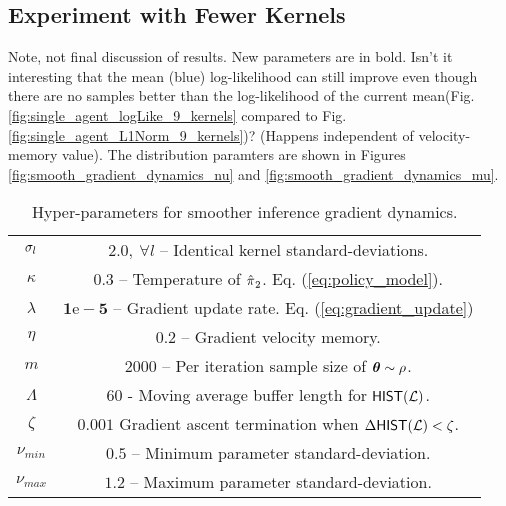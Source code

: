 \subsection{Experiment with Fewer Kernels}

\color{blue} Note, not final discussion of results. \color{black}
New parameters are in bold. Isn't it interesting that the mean (blue) log-likelihood can still improve even though there
are no samples better than the log-likelihood of the current mean(Fig. \ref{fig:single_agent_logLike_9_kernels} compared to Fig. \ref{fig:single_agent_L1Norm_9_kernels})? (Happens independent of velocity-memory value). The distribution paramters are shown in Figures \ref{fig:smooth_gradient_dynamics_nu} and \ref{fig:smooth_gradient_dynamics_mu}.

    \begin{table}[H]
    \centering
    \begin{tabular}{c|c}
        $\sigma_{l}$ & $2.0,\ \forall l$ -- Identical kernel standard-deviations.\\
        $\kappa$ & $\mathbf{0.3}$ -- Temperature of $\hat{\pi_{}}_2$. Eq. (\ref{eq:policy_model}). \\
        $\lambda$ & $\mathbf{1\mathrm{e}\!-\!5}$ -- Gradient update rate. Eq. (\ref{eq:gradient_update}) \\
        $\eta$ & $\mathbf{0.2}$ -- Gradient velocity memory.\\
        $m$ & 2000 -- Per iteration sample size of $\boldsymbol{\mathbb{\theta}}\sim \rho$.\\
        $\Lambda$ & $60$ - Moving average buffer length for $\mathsf{HIST}(\mathcal{L})$. \\
        $\zeta$ & $0.001$ Gradient ascent termination when $\Delta\mathsf{HIST}(\mathcal{L}) < \zeta$.\\
        $\nu_{min}$ & $0.5$ -- Minimum parameter standard-deviation.\\
        $\nu_{max}$ & $1.2$ -- Maximum parameter standard-deviation.\\
    \end{tabular}
    \caption{Hyper-parameters for smoother inference gradient dynamics.}
    \label{table:single_agent_new_hyper_params}
    \end{table}

    \begin{figure}[htb]
        \begin{center}
        \end{center}
    \end{figure}

